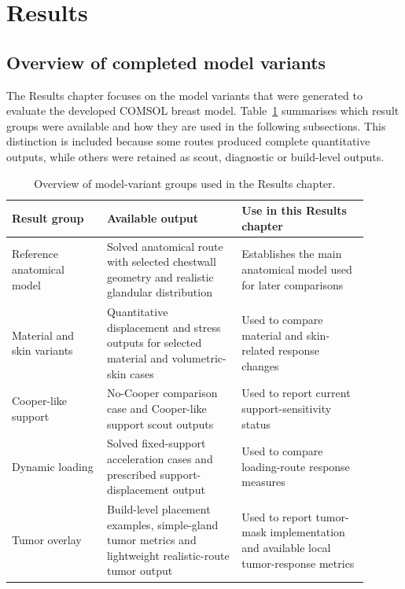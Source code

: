 \section{Results}
\label{results}



\subsection{Overview of completed model variants}
\label{overview_completed_model_variants}

The Results chapter focuses on the model variants that were generated to evaluate the developed COMSOL breast model. Table~\ref{completed_model_variant_overview_table} summarises which result groups were available and how they are used in the following subsections. This distinction is included because some routes produced complete quantitative outputs, while others were retained as scout, diagnostic or build-level outputs.

\begin{table}[H]
\centering
\small
\caption{Overview of model-variant groups used in the Results chapter.}
\label{completed_model_variant_overview_table}
\begin{tabular}{
>{\raggedright\arraybackslash}p{0.24\linewidth}
>{\raggedright\arraybackslash}p{0.34\linewidth}
>{\raggedright\arraybackslash}p{0.32\linewidth}
}
\toprule
Result group & Available output & Use in this Results chapter \\
\midrule
Reference anatomical model 
& Solved anatomical route with selected chestwall geometry and realistic glandular distribution 
& Establishes the main anatomical model used for later comparisons \\

Material and skin variants 
& Quantitative displacement and stress outputs for selected material and volumetric-skin cases 
& Used to compare material and skin-related response changes \\

Cooper-like support 
& No-Cooper comparison case and Cooper-like support scout outputs 
& Used to report current support-sensitivity status \\

Dynamic loading 
& Solved fixed-support acceleration cases and prescribed support-displacement output 
& Used to compare loading-route response measures \\

Tumor overlay 
& Build-level placement examples, simple-gland tumor metrics and lightweight realistic-route tumor output 
& Used to report tumor-mask implementation and available local tumor-response metrics \\
\bottomrule
\end{tabular}
\end{table}

